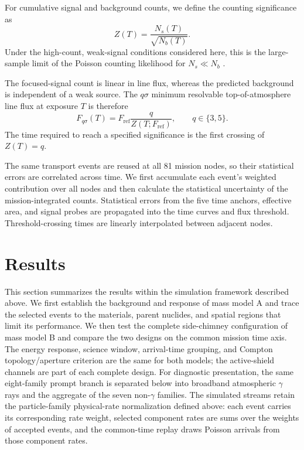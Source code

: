 \documentclass[11pt]{article}
\newcommand{\revblue}[1]{\textcolor{revisionblue}{#1}}
\newcommand{\fref}{F_{\mathrm{ref}}}
\begin{document}
For cumulative signal and background counts, we define the counting
significance as
\begin{equation}
 Z(T)=\frac{N_s(T)}{\sqrt{N_b(T)}}.
 \label{eq:mission_significance}
\end{equation}
Under the high-count, weak-signal conditions considered here, this is the
large-sample limit of the Poisson counting likelihood for $N_s\ll N_b$
\cite{Cowan2011}.

The focused-signal count is linear in line flux, whereas the predicted
background is independent of a weak source. The $q\sigma$ minimum resolvable
top-of-atmosphere line flux at exposure $T$ is therefore
\begin{equation}
 F_{q\sigma}(T)=\fref\frac{q}{Z(T;\fref)},
 \qquad q\in\{3,5\}.
 \label{eq:minimum_flux}
\end{equation}
The time required to reach a specified significance is the first crossing of
$Z(T)=q$.

The same transport events are reused at all 81 mission nodes, so their
statistical errors are correlated across time. We first accumulate each event's
weighted contribution over all nodes and then calculate the statistical
uncertainty of the mission-integrated counts. Statistical errors from the five
time anchors, effective area, and signal probes are propagated into the time
curves and flux threshold. Threshold-crossing times are linearly interpolated
between adjacent nodes.

\section{Results}
\label{sec:results}

This section summarizes the results within the simulation framework described above. We first establish the background and response of mass model A and trace the selected events to the materials, parent nuclides, and spatial regions that limit its performance. We then test the complete side-chimney configuration of mass model B and compare the two designs on the common mission time axis. The energy response, science window, arrival-time grouping, and Compton topology/aperture criterion are the same for both models; the active-shield channels are part of each complete design. \revblue{For diagnostic presentation, the same eight-family prompt branch is separated below into broadband atmospheric $\gamma$ rays and the aggregate of the seven non-$\gamma$ families. The simulated streams retain the particle-family physical-rate normalization defined above: each event carries its corresponding rate weight, selected component rates are sums over the weights of accepted events, and the common-time replay draws Poisson arrivals from those component rates.}
\end{document}
